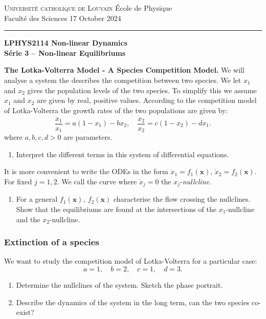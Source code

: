 \documentclass{article}
\begin{document}
\noindent
{\textsc{Universit\'e catholique de Louvain}} \hfill \'Ecole de Physique\\
Facult\'e des Sciences \hfill 17 October 2024\\
\hrule

\bigskip

\begin{center}
  \textbf{LPHYS2114 Non-linear Dynamics}\\
  \textbf{S\'erie 3 -- Non-linear Equilibriums} 
\end{center}

{}

\begin{question}
  \textbf{The Lotka-Volterra Model - A Species Competition Model.} We will analyse a system the describes the competition between two species. We let $x_1$ and $x_2$ gives the population levels of the two species. To simplify this we assume $x_1$ and $x_2$ are given by real, positive values. According to the competition model of Lotka-Volterra the growth rates of the two populations are given by:
  \begin{equation}
    \frac{\dot x_1}{x_1} = a(1-x_1) - b x_2, \quad \frac{\dot x_2}{x_2} = c(1-x_2) - d x_1.
    \label{eqn:LotkaVolterra}
  \end{equation}
  where $a,b,c,d>0$ are parameters.
  \begin{enumerate}[label=(\alph*)]
    \item Interpret the different terms in this system of differential equations.
  \end{enumerate}
  It is more convenient to write the ODEs in the form $\dot x_1 = f_1(\bm x),\,\dot x_2=f_2(\bm x)$. For fixed $j=1,2$. We call the curve where $\dot x_j = 0$ the $x_j$-\textit{nullcline}.
  \begin{enumerate}[label=(\alph*),resume]
    \item For a general $f_1(\bm x),~f_2(\bm x)$ characterise the flow crossing the nullclines. Show that the equilibriums are found at the intersections of the $x_1$-nullcline and the $x_2$-nullcline.
   \end{enumerate}
  
  \subsubsection*{Extinction of a species}
  We want to study the competition model of Lotka-Volterra for a particular case: 
  \begin{equation}
    a=1,\quad b=2,\quad c=1,\quad d=3.
  \end{equation}
  \begin{enumerate}[label=(\alph*),resume]
     \item Determine the nullclines of the system. Sketch the phase portrait.
     \item Describe the dynamics of the system in the long term, can the two species co-exist? 
  \end{enumerate}
  

\end{question}
\end{document}
